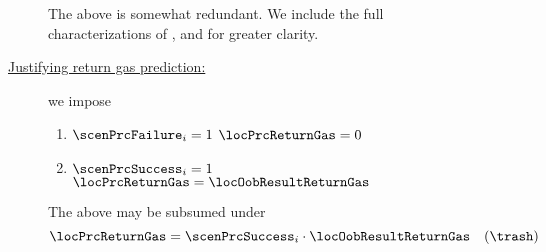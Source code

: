\begin{description}
\begin{description}
				\saNote{} The above is somewhat redundant. We include the full characterizations of
				\scenPrcSuccess{},
				\scenPrcFailureKnownToRam{} and
				\scenPrcFailureKnownToRam{} for greater clarity.
			\item[\underline{Justifying return gas prediction:}]
				we impose
				\begin{enumerate}
				        \item \If $\scenPrcFailure_{i} = 1$ \Then $\locPrcReturnGas = 0$
				        \item \If $\scenPrcSuccess_{i} = 1$ \Then $\locPrcReturnGas = \locOobResultReturnGas$
				\end{enumerate}
				\saNote{} The above may be subsumed under
				\[
					\locPrcReturnGas
					=
					\scenPrcSuccess_{i}
					\cdot
					\locOobResultReturnGas
					\quad (\trash)
				\]
		\end{description}
	\end{description}
